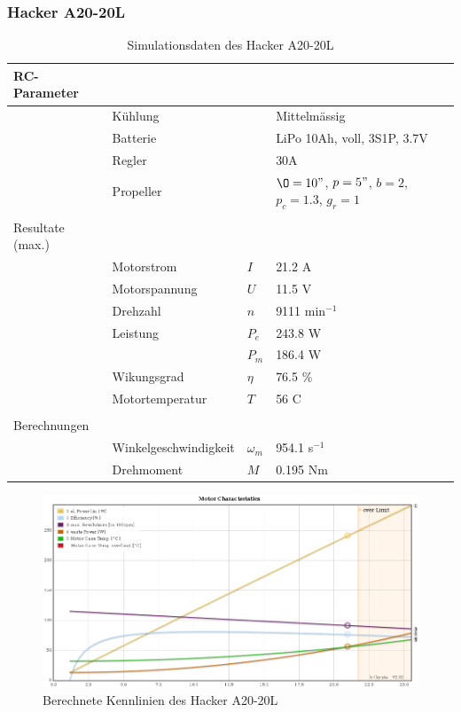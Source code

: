 \subsubsection*{Hacker A20-20L}

\begin{table}[h!]
	\centering
	\begin{tabular}{l l l l}
		RC-Parameter & & & \\ \hline
			& Kühlung	& & Mittelmässig \\
			& Batterie	& & LiPo 10Ah, voll, 3S1P, 3.7V \\
			& Regler	& & 30A \\
			& Propeller	& & $\O=10"$, $p=5"$, $b=2$, $p_c=1.3$, $g_r=1$ \\
			& & & \\
		Resultate (max.) & & & \\ \hline
			& Motorstrom	& $I$	& 21.2 A \\
			& Motorspannung	& $U$	& 11.5 V \\
			& Drehzahl	& $n$	& 9111 min$^{-1}$ \\
			& Leistung 	& $P_e$	& 243.8 W \\
			&		& $P_m$	& 186.4 W \\
			& Wikungsgrad	& $\eta$& 76.5 \% \\
			& Motortemperatur
					& $T$	& 56 C \\
			& & & \\
		Berechnungen & & & \\ \hline
			& Winkelgeschwindigkeit
					& $\omega_m$	& 954.1 s$^{-1}$ \\
			& Drehmoment	& $M$		& 0.195 Nm
	\end{tabular}
	\caption{Simulationsdaten des Hacker A20-20L}
\end{table}

\begin{figure}[h!]
	\centering
	\includegraphics[width=1\textwidth]{../../fig/motor/ecalc_A20-20L.png}
	\caption{Berechnete Kennlinien des Hacker A20-20L}
	\label{fig:ecalc_A20-20L}
\end{figure}
